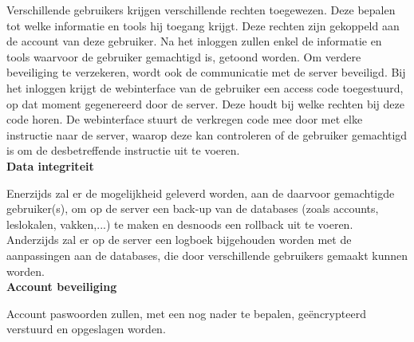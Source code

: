 \documentclass{article}
\begin{document}
Verschillende gebruikers krijgen verschillende rechten toegewezen. Deze bepalen tot welke informatie en tools hij toegang krijgt. Deze rechten zijn gekoppeld aan de account van deze gebruiker. Na het inloggen zullen enkel de informatie en tools waarvoor de gebruiker gemachtigd is, getoond worden. Om verdere beveiliging te verzekeren, wordt ook de communicatie met de server beveiligd. Bij het inloggen krijgt de webinterface van de gebruiker een access code toegestuurd, op dat moment gegenereerd door de server. Deze houdt bij welke rechten bij deze code horen. De webinterface stuurt de verkregen code mee door met elke instructie naar de server, waarop deze kan controleren of de gebruiker gemachtigd is om de desbetreffende instructie uit te voeren.\\

\textbf{Data integriteit}

Enerzijds zal er de mogelijkheid geleverd worden, aan de daarvoor gemachtigde gebruiker(s), om op de server een back-up van de databases (zoals accounts, leslokalen, vakken,...) te maken en desnoods een rollback uit te voeren.
Anderzijds zal er op de server een logboek bijgehouden worden met de aanpassingen aan de databases, die door verschillende gebruikers gemaakt kunnen worden.\\

\textbf{Account beveiliging}

Account paswoorden zullen, met een nog nader te bepalen, ge\"{e}ncrypteerd verstuurd en opgeslagen
worden.







 
\end{document}
